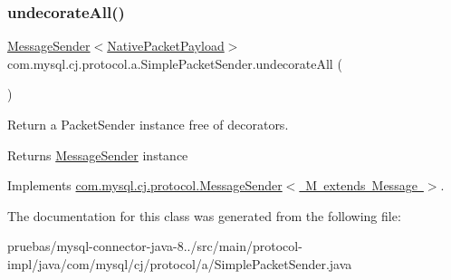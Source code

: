 \mbox{\label{classcom_1_1mysql_1_1cj_1_1protocol_1_1a_1_1_simple_packet_sender_a2fa36445cf29dff6e32000dc6c95c831}} 
\subsubsection{\texorpdfstring{undecorate\+All()}{undecorateAll()}}
{\footnotesize\ttfamily \mbox{\hyperlink{interfacecom_1_1mysql_1_1cj_1_1protocol_1_1_message_sender}{Message\+Sender}}$<$\mbox{\hyperlink{classcom_1_1mysql_1_1cj_1_1protocol_1_1a_1_1_native_packet_payload}{Native\+Packet\+Payload}}$>$ com.\+mysql.\+cj.\+protocol.\+a.\+Simple\+Packet\+Sender.\+undecorate\+All (\begin{DoxyParamCaption}{ }\end{DoxyParamCaption})}

Return a Packet\+Sender instance free of decorators.

\begin{DoxyReturn}{Returns}
\mbox{\hyperlink{interfacecom_1_1mysql_1_1cj_1_1protocol_1_1_message_sender}{Message\+Sender}} instance 
\end{DoxyReturn}


Implements \mbox{\hyperlink{interfacecom_1_1mysql_1_1cj_1_1protocol_1_1_message_sender_a8066931f03c2fa9cc705716fa10a4517}{com.\+mysql.\+cj.\+protocol.\+Message\+Sender$<$ M extends Message $>$}}.



The documentation for this class was generated from the following file\+:\begin{DoxyCompactItemize}
\item 
pruebas/mysql-\/connector-\/java-\/8../src/main/protocol-\/impl/java/com/mysql/cj/protocol/a/Simple\+Packet\+Sender.\+java\end{DoxyCompactItemize}
